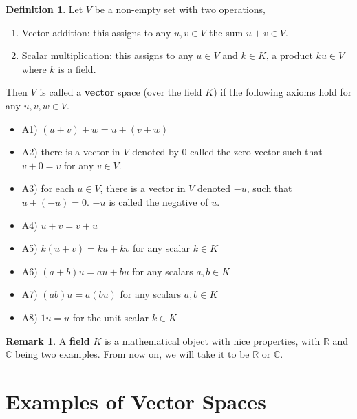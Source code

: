 \documentclass{report}
\theoremstyle{definition}
\newtheorem{_def}{Definition}
\newtheorem{_rem}{Remark}
\begin{document}
\begin{_def}

Let $V$ be a non-empty set with two operations,
\begin{enumerate}[i]
 \item Vector addition: this assigns to any $u,v\in V$ the sum $u+v\in V$.
 \item Scalar multiplication: this assigns to any $u\in V$ and $k\in K$, a product $ku\in V$ where $k$ is a field.
\end{enumerate}
Then $V$ is called a \textbf{vector} space (over the field $K$) if the following axioms hold for any $u,v,w\in V$.
\begin{itemize}
 \item A1) $(u+v)+w=u+(v+w)$
 \item A2) there is a vector in $V$ denoted by $0$ called the zero vector such that $v+0=v$ for any $v\in V$.
 \item A3) for each $u\in V$, there is a vector in $V$ denoted $-u$, such that $u+(-u)=0$.
 $-u$ is called the negative of $u$.
 \item A4) $u+v=v+u$
 \item A5) $k(u+v)=ku+kv$ for any scalar $k\in K$
 \item A6) $(a+b)u=au+bu$ for any scalars $a,b\in K$
 \item A7) $(ab)u=a(bu)$ for any scalars $a,b\in K$
 \item A8) $1u=u$ for the unit scalar $k\in K$
\end{itemize}
\end{_def}

\begin{_rem}
A \textbf{field} $K$ is a mathematical object with nice properties, with $\mathbb{R}$ and $\mathbb{C}$ being two examples. From now on, we will take it to be $\mathbb{R}$ or $\mathbb{C}$.
\end{_rem}

\section{Examples of Vector Spaces}
\end{document}
